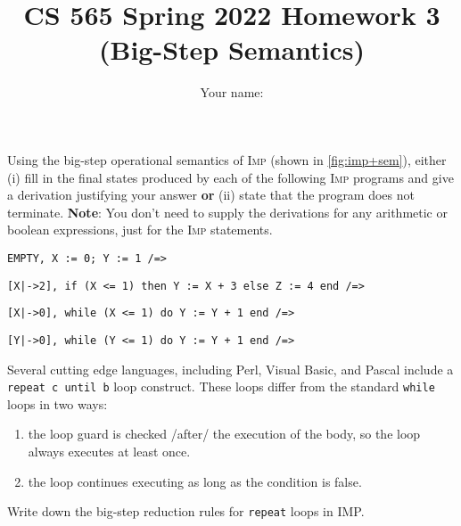 \documentclass[12pt]{article}
\newenvironment{problem}[2][Problem]{\begin{trivlist}
\item[\hskip \labelsep {\bfseries #1}\hskip \labelsep {\bfseries #2.}]}{\end{trivlist}}
\begin{document}
\title{CS 565 Spring 2022 Homework 3 (Big-Step Semantics)}
\author{Your name: \underline{\hspace{10cm}}}
\maketitle

Using the big-step operational semantics of \textsc{Imp} (shown in
\autoref{fig:imp+sem}), either (i) fill in the final states produced
by each of the following \textsc{Imp} programs and give a derivation
justifying your answer \textbf{or} (ii) state that the program does
not terminate. \textbf{Note}: You don't need to supply the derivations
for any arithmetic or boolean expressions, just for the \textsc{Imp}
statements.

\begin{problem}{1 (1 point)}
\end{problem}
\vspace{6cm}
\begin{center}
  \lstinline!EMPTY, X := 0; Y := 1 /=> !
\end{center}


\begin{problem}{2 (1 point)}
\end{problem}
\vspace{6cm}
\begin{center}
  \lstinline![X|->2], if (X <= 1) then Y := X + 3 else Z := 4 end /=>!
\end{center}

\pagebreak

\begin{problem}{3 (1 point)}
\end{problem}
\vspace{6cm}
\begin{center}
  \lstinline![X|->0], while (X <= 1) do Y := Y + 1 end /=>!
\end{center}

\begin{problem}{4 (1 point)}
\end{problem}
\begin{center}
  \vspace{14cm}
  \lstinline![Y|->0], while (Y <= 1) do Y := Y + 1 end /=>!
\end{center}


\pagebreak

\begin{problem}{5 (2 points)}
  Several cutting edge languages, including Perl, Visual Basic, and
  Pascal include a \lstinline|repeat c until b| loop construct.  These
  loops differ from the standard \lstinline|while| loops in two ways:
  \begin{enumerate}
  \item the loop guard is checked /after/ the execution of the body, so
      the loop always executes at least once.
    \item the loop continues executing as long as the condition is
      false.
    \end{enumerate}
    Write down the big-step reduction rules for \lstinline|repeat|
    loops in IMP.
  \end{problem}
\end{document}
